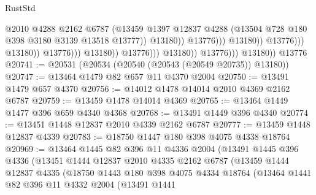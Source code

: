 \begin{lexlean}{RustStd}
\begin{coremodule}
{\begin{coremodule}
{{{{{{{{{{{{{{{{{{{{{{{{{{{{{{{                                                          @2010
                                                          @4288
                                                          @2162
                                                          @6787
                                                          (@13459
                                                            @1397
                                                            @12837
                                                            @4288
                                                            (@13504
                                                              @728
                                                              @180
                                                              @398
                                                              @3180
                                                              @3139
                                                              @13518
                                                              @13777))
                                                          @13180))
                                                      @13776)))
                                                @13180))
                                            @13776)))
                                      @13180))
                                  @13776)))
                            @13180))
                        @13776)))
                  @13180))
              @13776)))
        @13180))
    @13776
@20741 := @20531 (@20534 (@20540 (@20543 (@20549 @20735)) @13180))
@20747 := @13464 @1479 @82 @657 @11 @4370 @2004
@20750 := @13491 @1479 @657 @4370
@20756 := @14012 @1478 @14014 @2010 @4369 @2162 @6787
@20759 := @13459 @1478 @14014 @4369
@20765 := @13464 @1449 @1477 @396 @659 @4340 @4368
@20768 := @13491 @1449 @396 @4340
@20774 := @13451 @1448 @12837 @2010 @4339 @2162 @6787
@20777 := @13459 @1448 @12837 @4339
@20783 := @18750 @1447 @180 @398 @4075 @4338 @18764
@20969 := @13464
    @1445
    @82
    @396
    @11
    @4336
    @2004
    (@13491
      @1445
      @396
      @4336
      (@13451
        @1444
        @12837
        @2010
        @4335
        @2162
        @6787
        (@13459
          @1444
          @12837
          @4335
          (@18750
            @1443
            @180
            @398
            @4075
            @4334
            @18764
            (@13464
              @1441
              @82
              @396
              @11
              @4332
              @2004
              (@13491
                @1441
}}}}}}}}}}}}}}}}}}}}}}}}}}}}}}}
\end{coremodule}}
\end{coremodule}
\end{lexlean}
